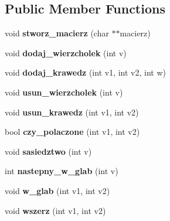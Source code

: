 \subsection*{\-Public \-Member \-Functions}
\begin{DoxyCompactItemize}
\item 
\hypertarget{classgraf_a2118758218625a70d32dcf01044df4ea}{void {\bfseries stworz\-\_\-macierz} (char $\ast$$\ast$macierz)}\label{classgraf_a2118758218625a70d32dcf01044df4ea}

\item 
\hypertarget{classgraf_a35100a3bdbd10cc6b910661a949810e6}{void {\bfseries dodaj\-\_\-wierzcholek} (int v)}\label{classgraf_a35100a3bdbd10cc6b910661a949810e6}

\item 
\hypertarget{classgraf_adc5aa4ebf7a250bdc26e082d8e529acf}{void {\bfseries dodaj\-\_\-krawedz} (int v1, int v2, int w)}\label{classgraf_adc5aa4ebf7a250bdc26e082d8e529acf}

\item 
\hypertarget{classgraf_abe0ff8a414e519b22d80a637b6a1b7b9}{void {\bfseries usun\-\_\-wierzcholek} (int v)}\label{classgraf_abe0ff8a414e519b22d80a637b6a1b7b9}

\item 
\hypertarget{classgraf_a098650e7621b94ecff5e6be866b15b3f}{void {\bfseries usun\-\_\-krawedz} (int v1, int v2)}\label{classgraf_a098650e7621b94ecff5e6be866b15b3f}

\item 
\hypertarget{classgraf_af6698c3f84ab5523ecd862c67d12500c}{bool {\bfseries czy\-\_\-polaczone} (int v1, int v2)}\label{classgraf_af6698c3f84ab5523ecd862c67d12500c}

\item 
\hypertarget{classgraf_a81ba0576d3d2b08441dcc11eea9bfdd8}{void {\bfseries sasiedztwo} (int v)}\label{classgraf_a81ba0576d3d2b08441dcc11eea9bfdd8}

\item 
\hypertarget{classgraf_a02a49e16cb914a0e1156f61536a75b3a}{int {\bfseries nastepny\-\_\-w\-\_\-glab} (int v)}\label{classgraf_a02a49e16cb914a0e1156f61536a75b3a}

\item 
\hypertarget{classgraf_a7d2f807964ecedb5bc8e731a81e86946}{void {\bfseries w\-\_\-glab} (int v1, int v2)}\label{classgraf_a7d2f807964ecedb5bc8e731a81e86946}

\item 
\hypertarget{classgraf_afb6519bf2325ac6d4ea38512b1d78eab}{void {\bfseries wszerz} (int v1, int v2)}\label{classgraf_afb6519bf2325ac6d4ea38512b1d78eab}

\end{DoxyCompactItemize}
